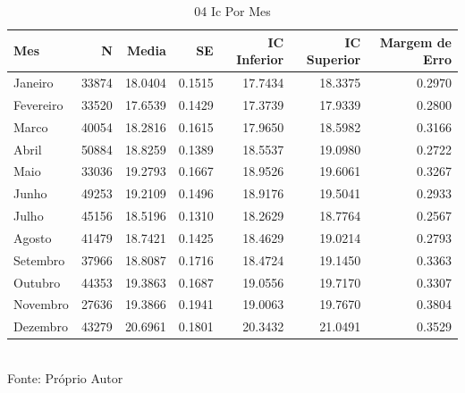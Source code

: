 \begin{table}[H]
\centering
\small
\caption{04 Ic Por Mes}
\label{tab:06_04_Intervalos_Confianca}
\begin{tabular}{|l|r|r|r|r|r|r|}
\hline
\textbf{Mes} & \textbf{N} & \textbf{Media} & \textbf{SE} & \textbf{IC Inferior} & \textbf{IC Superior} & \textbf{Margem de Erro} \\
\hline
Janeiro & 33874 & 18.0404 & 0.1515 & 17.7434 & 18.3375 & 0.2970 \\
Fevereiro & 33520 & 17.6539 & 0.1429 & 17.3739 & 17.9339 & 0.2800 \\
Marco & 40054 & 18.2816 & 0.1615 & 17.9650 & 18.5982 & 0.3166 \\
Abril & 50884 & 18.8259 & 0.1389 & 18.5537 & 19.0980 & 0.2722 \\
Maio & 33036 & 19.2793 & 0.1667 & 18.9526 & 19.6061 & 0.3267 \\
Junho & 49253 & 19.2109 & 0.1496 & 18.9176 & 19.5041 & 0.2933 \\
Julho & 45156 & 18.5196 & 0.1310 & 18.2629 & 18.7764 & 0.2567 \\
Agosto & 41479 & 18.7421 & 0.1425 & 18.4629 & 19.0214 & 0.2793 \\
Setembro & 37966 & 18.8087 & 0.1716 & 18.4724 & 19.1450 & 0.3363 \\
Outubro & 44353 & 19.3863 & 0.1687 & 19.0556 & 19.7170 & 0.3307 \\
Novembro & 27636 & 19.3866 & 0.1941 & 19.0063 & 19.7670 & 0.3804 \\
Dezembro & 43279 & 20.6961 & 0.1801 & 20.3432 & 21.0491 & 0.3529 \\
\hline
\end{tabular}
\\ \small Fonte: Próprio Autor
\end{table}
